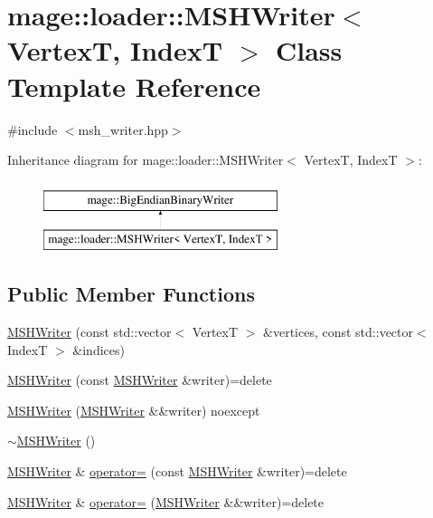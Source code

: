 \hypertarget{classmage_1_1loader_1_1_m_s_h_writer}{}\section{mage\+:\+:loader\+:\+:M\+S\+H\+Writer$<$ VertexT, IndexT $>$ Class Template Reference}
\label{classmage_1_1loader_1_1_m_s_h_writer}


{\ttfamily \#include $<$msh\+\_\+writer.\+hpp$>$}

Inheritance diagram for mage\+:\+:loader\+:\+:M\+S\+H\+Writer$<$ VertexT, IndexT $>$\+:\begin{figure}[H]
\begin{center}
\leavevmode
\includegraphics[height=2.000000cm]{classmage_1_1loader_1_1_m_s_h_writer}
\end{center}
\end{figure}
\subsection*{Public Member Functions}
\begin{DoxyCompactItemize}
\item 
\hyperlink{classmage_1_1loader_1_1_m_s_h_writer_a71c1711cbf4f299bb894136742d925e6}{M\+S\+H\+Writer} (const std\+::vector$<$ VertexT $>$ \&vertices, const std\+::vector$<$ IndexT $>$ \&indices)
\item 
\hyperlink{classmage_1_1loader_1_1_m_s_h_writer_ad1c8effc343620ada22ebd980d4e0dae}{M\+S\+H\+Writer} (const \hyperlink{classmage_1_1loader_1_1_m_s_h_writer}{M\+S\+H\+Writer} \&writer)=delete
\item 
\hyperlink{classmage_1_1loader_1_1_m_s_h_writer_a31892f7b5edc957e9de92fd24ef720b9}{M\+S\+H\+Writer} (\hyperlink{classmage_1_1loader_1_1_m_s_h_writer}{M\+S\+H\+Writer} \&\&writer) noexcept
\item 
\hyperlink{classmage_1_1loader_1_1_m_s_h_writer_a91cff6fd4ba009db4b2db82d18ca533e}{$\sim$\+M\+S\+H\+Writer} ()
\item 
\hyperlink{classmage_1_1loader_1_1_m_s_h_writer}{M\+S\+H\+Writer} \& \hyperlink{classmage_1_1loader_1_1_m_s_h_writer_a27976d47d2ef19b8a1e1d3e79347439a}{operator=} (const \hyperlink{classmage_1_1loader_1_1_m_s_h_writer}{M\+S\+H\+Writer} \&writer)=delete
\item 
\hyperlink{classmage_1_1loader_1_1_m_s_h_writer}{M\+S\+H\+Writer} \& \hyperlink{classmage_1_1loader_1_1_m_s_h_writer_ac470e8a781db03c6d3138393a66518f4}{operator=} (\hyperlink{classmage_1_1loader_1_1_m_s_h_writer}{M\+S\+H\+Writer} \&\&writer)=delete
\end{DoxyCompactItemize}
